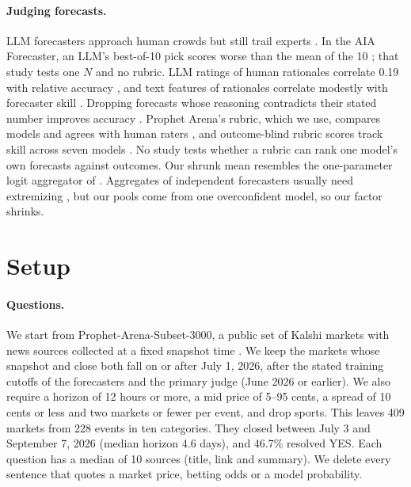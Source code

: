 \documentclass[letterpaper]{article} %
\begin{document}
\paragraph{Judging forecasts.} LLM forecasters approach human crowds \citep{halawi2024approaching,schoenegger2024wisdom} but still trail experts \citep{karger2025forecastbench}. In the AIA Forecaster, an LLM's best-of-10 pick scores worse than the mean of the 10 \citep{aia2025forecaster}; that study tests one $N$ and no rubric. LLM ratings of human rationales correlate 0.19 with relative accuracy \citep{fri2026}, and text features of rationales correlate modestly with forecaster skill \citep{karvetski2022forecasting}. Dropping forecasts whose reasoning contradicts their stated number improves accuracy \citep{gorur2025argumentatively}. Prophet Arena's rubric, which we use, compares models and agrees with human raters \citep{prophetarena2025}, and outcome-blind rubric scores track skill across seven models \citep{echo2026}. No study tests whether a rubric can rank one model's own forecasts against outcomes. Our shrunk mean resembles the one-parameter logit aggregator of \citet{satopaa2014combining}. Aggregates of independent forecasters usually need extremizing \citep{baron2014two}, but our pools come from one overconfident model, so our factor shrinks.

\section{Setup}\label{sec:setup}
\paragraph{Questions.} We start from Prophet-Arena-Subset-3000, a public set of Kalshi markets with news sources collected at a fixed snapshot time \citep{prophetarena2025}. We keep the markets whose snapshot and close both fall on or after July 1, 2026, after the stated training cutoffs of the forecasters and the primary judge (June 2026 or earlier). We also require a horizon of 12 hours or more, a mid price of 5--95 cents, a spread of 10 cents or less and two markets or fewer per event, and drop sports. This leaves 409 markets from 228 events in ten categories. They closed between July 3 and September 7, 2026 (median horizon 4.6 days), and 46.7\% resolved YES. Each question has a median of 10 sources (title, link and summary). We delete every sentence that quotes a market price, betting odds or a model probability.
\end{document}
